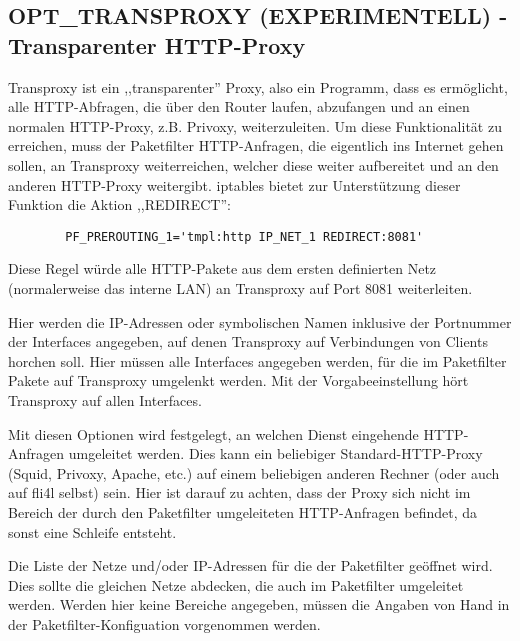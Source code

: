 \subsection{OPT\_TRANSPROXY (EXPERIMENTELL) - Transparenter HTTP-Proxy}

Transproxy ist ein ,,transparenter'' Proxy, also ein Programm, dass es
ermöglicht, alle HTTP-Abfragen, die über den Router laufen, abzufangen und an
einen normalen HTTP-Proxy, z.B. Privoxy, weiterzuleiten. Um diese
Funktionalität zu erreichen, muss der Paketfilter HTTP-Anfragen, die eigentlich
ins Internet gehen sollen, an Transproxy weiterreichen, welcher diese weiter
aufbereitet und an den anderen HTTP-Proxy weitergibt. iptables bietet zur
Unterstützung dieser Funktion die Aktion ,,REDIRECT'':

\begin{verbatim}
        PF_PREROUTING_1='tmpl:http IP_NET_1 REDIRECT:8081'
\end{verbatim}

Diese Regel würde alle HTTP-Pakete aus dem ersten definierten Netz
(normalerweise das interne LAN) an Transproxy auf Port 8081 weiterleiten.

\begin{description}


        {Hier werden die IP-Adressen oder symbolischen Namen inklusive
        der Portnummer der Interfaces angegeben, auf denen Transproxy auf
        Verbindungen von Clients horchen soll. Hier müssen alle Interfaces
        angegeben werden, für die im Paketfilter Pakete auf Transproxy
        umgelenkt werden. Mit der Vorgabeeinstellung  hört
        Transproxy auf allen Interfaces.}


        {Mit diesen Optionen wird festgelegt, an welchen Dienst eingehende
        HTTP-Anfragen umgeleitet werden. Dies kann ein beliebiger
        Standard-HTTP-Proxy (Squid, Privoxy, Apache, etc.) auf einem beliebigen
        anderen Rechner (oder auch auf fli4l selbst) sein. Hier ist darauf zu
achten,
        dass der Proxy sich nicht im Bereich der durch den Paketfilter
        umgeleiteten HTTP-Anfragen befindet, da sonst eine Schleife entsteht.}


        {Die Liste der Netze und/oder IP-Adressen für die der
        Paketfilter geöffnet wird. Dies sollte die gleichen Netze abdecken, die
        auch im Paketfilter umgeleitet werden. Werden hier keine Bereiche
        angegeben, müssen die Angaben von Hand in der Paketfilter-Konfiguation
        vorgenommen werden.}

\end{description}
